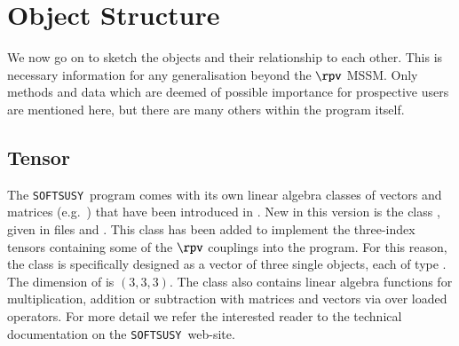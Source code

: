 \documentclass[final,3p,times,pdflatex]{elsarticle}
\def\SOFTSUSY{{\tt SOFTSUSY}}
\begin{document}
\section{Object Structure\label{sec:objects}}

We now go on to sketch the objects and their relationship to each other. This
is necessary information for any generalisation beyond the $\rpv$ MSSM\@. Only
methods and data which are deemed of possible importance for prospective users
are 
mentioned here, but there are many others within the program itself.

\subsection{Tensor}
\label{tensor}

The \SOFTSUSY~program comes with its own linear algebra classes of vectors and
matrices (e.g.\ ) that 
have been introduced in \cite{Allanach:2001kg}.
New in this version is the class , given in files
 and . This class has been added to
implement the three-index tensors containing some of the $\rpv$ couplings
into the program. For this reason, the class is specifically designed as a
vector of three single objects, each of type . The
dimension of  is $(3,3,3)$. The class also
contains linear algebra functions for multiplication, addition or subtraction
with matrices and vectors via over loaded operators. For 
more detail we refer the interested reader to 
the technical documentation on the \SOFTSUSY~web-site.
\end{document}
